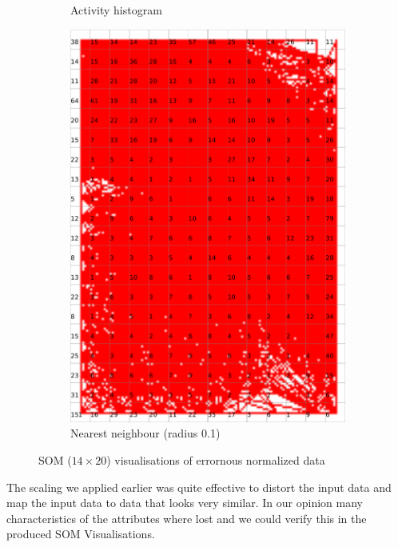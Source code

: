 \documentclass{acm_proc_article-sp}
\begin{document}
\begin{figure}
\begin{subfigure}[b]{0.45\linewidth}
        \caption{Activity histogram}
        \label{fig:wine-weird-activity-histogram}
    \end{subfigure}
    \begin{subfigure}[b]{0.45\linewidth}
        \includegraphics[width=\linewidth]{img/wine-weird-nearest-neighbour-radius}
        \caption{Nearest neighbour (radius 0.1)}
        \label{fig:wine-weird-nearest-neighbour-radius}
    \end{subfigure}
    \caption{SOM ($14\times20$) visualisations of errornous normalized data}
\end{figure}

The scaling we applied earlier was quite effective to distort the input data
and map the input data to data that looks very similar. In our opinion
many characteristics of the attributes where lost and we could verify this
in the produced SOM Visualisations.
\end{document}
